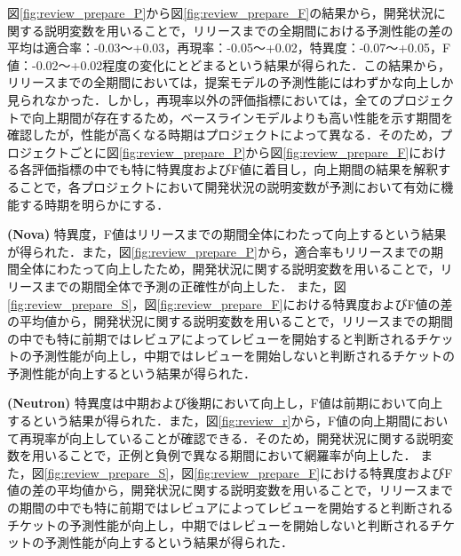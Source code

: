 \documentclass[11pt]{jreport}
\begin{document}
図\ref{fig:review_prepare_P}から図\ref{fig:review_prepare_F}の結果から，開発状況に関する説明変数を用いることで，リリースまでの全期間における予測性能の差の平均は適合率：-0.03〜+0.03，再現率：-0.05〜+0.02，特異度：-0.07〜+0.05，F値：-0.02〜+0.02程度の変化にとどまるという結果が得られた．この結果から，リリースまでの全期間においては，提案モデルの予測性能にはわずかな向上しか見られなかった．しかし，再現率以外の評価指標においては，全てのプロジェクトで向上期間が存在するため，ベースラインモデルよりも高い性能を示す期間を確認したが，性能が高くなる時期はプロジェクトによって異なる．そのため，プロジェクトごとに図\ref{fig:review_prepare_P}から図\ref{fig:review_prepare_F}における各評価指標の中でも特に特異度およびF値に着目し，向上期間の結果を解釈することで，各プロジェクトにおいて開発状況の説明変数が予測において有効に機能する時期を明らかにする．

\textbf{ (Nova) }特異度，F値はリリースまでの期間全体にわたって向上するという結果が得られた．また，図\ref{fig:review_prepare_P}から，適合率もリリースまでの期間全体にわたって向上したため，開発状況に関する説明変数を用いることで，リリースまでの期間全体で予測の正確性が向上した．
また，図\ref{fig:review_prepare_S}，図\ref{fig:review_prepare_F}における特異度およびF値の差の平均値から，開発状況に関する説明変数を用いることで，リリースまでの期間の中でも特に前期ではレビュアによってレビューを開始すると判断されるチケットの予測性能が向上し，中期ではレビューを開始しないと判断されるチケットの予測性能が向上するという結果が得られた．

\textbf{ (Neutron) }特異度は中期および後期において向上し，F値は前期において向上するという結果が得られた．また，図\ref{fig:review_r}から，F値の向上期間において再現率が向上していることが確認できる．そのため，開発状況に関する説明変数を用いることで，正例と負例で異なる期間において網羅率が向上した．
また，図\ref{fig:review_prepare_S}，図\ref{fig:review_prepare_F}における特異度およびF値の差の平均値から，開発状況に関する説明変数を用いることで，リリースまでの期間の中でも特に前期ではレビュアによってレビューを開始すると判断されるチケットの予測性能が向上し，中期ではレビューを開始しないと判断されるチケットの予測性能が向上するという結果が得られた．
\end{document}
